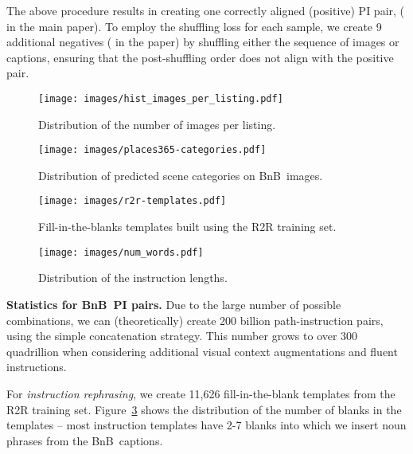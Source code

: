 \RequirePackage[dvipsnames,table]{xcolor} \documentclass[10pt,twocolumn,letterpaper]{article}
\newcommand{\p}[1]{\vspace{1mm}\noindent\textbf{#1}}
\newcommand{\airbnb}{BnB}
\begin{document}
The above procedure results in creating one correctly aligned (positive) PI pair, ( in the main paper).
To employ the shuffling loss for each sample, we create 9 additional negatives ( in the paper) by shuffling either the sequence of images or captions, ensuring that the post-shuffling order does not align with the positive pair.

\begin{figure*}[t]
    \centering
    \begin{subfigure}[b]{0.47\textwidth}
        \centering
        \texttt{[image: images/hist\_images\_per\_listing.pdf]}
        \caption{Distribution of the number of images per listing.}
        \label{fig:imgs_per_listing}
    \end{subfigure}
    \hfill
    \begin{subfigure}[b]{0.47\textwidth}
        \centering
        \texttt{[image: images/places365-categories.pdf]}
        \caption{Distribution of predicted scene categories on \airbnb~images.}
        \label{fig:img_categories}
    \end{subfigure}
    \hfill
    \begin{subfigure}[b]{0.47\textwidth}
        \centering
        \texttt{[image: images/r2r-templates.pdf]}
        \caption{Fill-in-the-blanks templates built using the R2R training set.}
        \label{fig:fillin-templates}
    \end{subfigure}
    \hfill
    \begin{subfigure}[b]{0.47\textwidth}
         \centering
         \texttt{[image: images/num\_words.pdf]}
         \caption{Distribution of the instruction lengths.}
         \label{fig:words_in_caption}
     \end{subfigure}
    \caption{Statistics of \airbnb~Dataset.}
    \label{fig:statistics}
\end{figure*}


\p{Statistics for \airbnb~PI pairs.}
Due to the large number of possible combinations, we can (theoretically) create 200 billion path-instruction pairs, using the simple concatenation strategy.
This number grows to over 300 quadrillion when considering additional visual context augmentations and fluent instructions.

For \emph{instruction rephrasing}, we create 11,626 fill-in-the-blank templates from the R2R training set.
Figure~\ref{fig:fillin-templates} shows the distribution of the number of blanks in the templates -- most instruction templates have 2-7 blanks into which we insert noun phrases from the \airbnb~captions.
\end{document}
